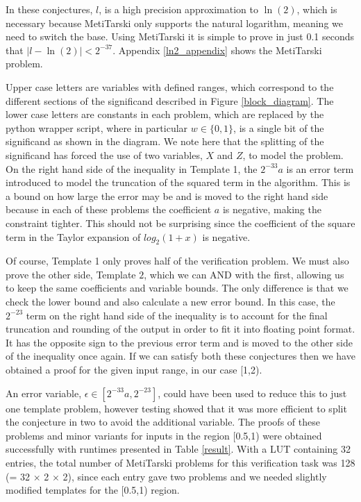 \documentclass{fac}
\newcommand{\abs}[1]{\lvert#1\rvert}
\begin{document}
In these conjectures, $l$, is a high precision approximation to $\ln(2)$, which is necessary because MetiTarski only supports the natural logarithm, meaning we need to switch the base. Using MetiTarski it is simple to prove in just 0.1 seconds that $\abs{l-\ln{(2)}}<2^{-37}$. Appendix \ref{ln2_appendix} shows the MetiTarski problem.
 
Upper case letters are variables with defined ranges, which correspond to the different sections of the significand described in Figure \ref{block_diagram}. The lower case letters are constants in each problem, which are replaced by the python wrapper script, where in particular $w\in \{0,1\}$, is a single bit of the significand as shown in the diagram. We note here that the splitting of the significand has forced the use of two variables, $X$ and $Z$, to model the problem. On the right hand side of the inequality in Template 1, the $2^{-33}a$ is an error term introduced to model the truncation of the squared term in the algorithm. This is a bound on how large the error may be and is moved to the right hand side because in each of these problems the coefficient $a$ is negative, making the constraint tighter. This should not be surprising since the coefficient of the square term in the Taylor expansion of $log_2(1+x)$ is negative. 

Of course, Template 1 only proves half of the verification problem. We must also prove the other side, Template $2$, which we can AND with the first, allowing us to keep the same coefficients and variable bounds. The only difference is that we check the lower bound and also calculate a new error bound. In this case, the $2^{-23}$ term on the right hand side of the inequality is to account for the final truncation and rounding of the output in order to fit it into floating point format. It has the opposite sign to the previous error term and is moved to the other side of the inequality once again. If we can satisfy both these conjectures then we have obtained a proof for the given input range, in our case [1,2). 

An error variable, $\epsilon \in [2^{-33}a, 2^{-23}]$, could have been used to reduce this to just one template problem, however testing showed that it was more efficient to split the conjecture in two to avoid the additional variable. The proofs of these problems and minor variants for inputs in the region [0.5,1) were obtained successfully with runtimes presented in Table \ref{result}. With a LUT containing 32 entries, the total number of MetiTarski problems for this verification task was 128 (= 32 $\times$ 2 $\times$ 2), since each entry gave two problems and we needed slightly modified templates for the [0.5,1) region. 
\end{document}
